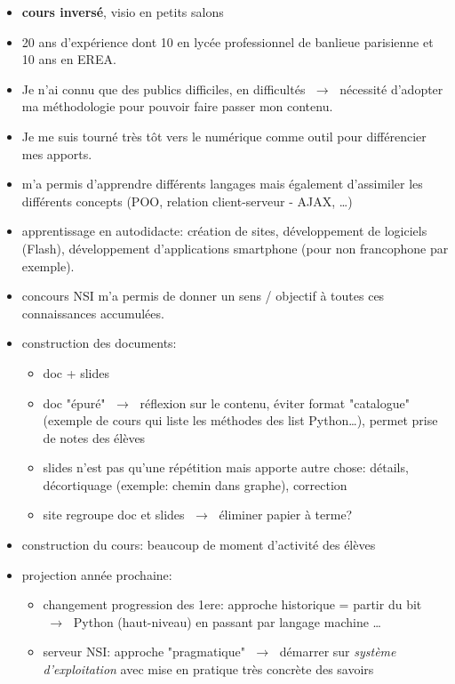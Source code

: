 \documentclass[a4paper,11pt]{article}
\begin{document}
\begin{itemize}
    \item \textbf{cours inversé}, visio en petits salons
    \item 20 ans d'expérience dont 10 en lycée professionnel de banlieue parisienne et 10 ans en EREA.
    \item Je n'ai connu que des publics difficiles, en difficultés $\;\rightarrow\;$ nécessité d'adopter ma méthodologie pour pouvoir faire passer mon contenu.
    \item Je me suis tourné très tôt vers le numérique comme outil pour différencier mes apports.
    \item m'a permis d'apprendre différents langages mais également d'assimiler les différents concepts (POO, relation client-serveur - AJAX, \dots)
    \item apprentissage en autodidacte: création de sites, développement de logiciels (Flash), développement d'applications smartphone (pour non francophone par exemple).
    \item concours NSI m'a permis de donner un sens / objectif à toutes ces connaissances accumulées.
    \item construction des documents:
          \begin{itemize}
              \item doc + slides
              \item doc "épuré" $\;\rightarrow\;$ réflexion sur le contenu, éviter format "catalogue" (exemple de cours qui liste les méthodes des list Python\dots), permet prise de notes des élèves
              \item slides n'est pas qu'une répétition mais apporte autre chose: détails, décortiquage (exemple: chemin dans graphe), correction
              \item site regroupe doc et slides $\;\rightarrow\;$ éliminer papier à terme?
          \end{itemize}
    \item construction du cours: beaucoup de moment d'activité des élèves
    \item projection année prochaine:
    \begin{itemize}
        \item changement progression des 1ere: approche historique = partir du bit $\;\rightarrow\;$ Python (haut-niveau) en passant par langage machine \dots
        \item serveur NSI: approche "pragmatique" $\;\rightarrow\;$ démarrer sur \emph{système d'exploitation} avec mise en pratique très concrète des savoirs
    \end{itemize}
\end{itemize}
\end{document}
